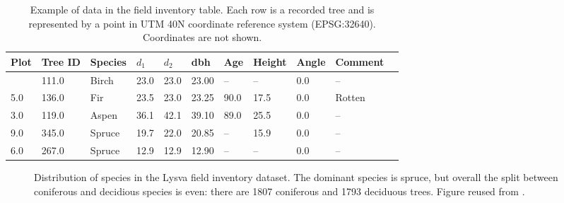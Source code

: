 \begin{longtable}[]{@{}lllllllllll@{}}

\caption[Example of data in the field inventory table.]{\label{tbl-inventory-example}Example of data in the field
inventory table. Each row is a recorded tree and is represented by a point in UTM 40N coordinate reference system (EPSG:32640). Coordinates are not shown.}

\tabularnewline

\toprule\noalign{}
Plot & Tree ID & Species & $d_1$ & $d_2$ & dbh & Age & Height & Angle &
Comment \\
\midrule\noalign{}
\endhead
\bottomrule\noalign{}
\endlastfoot
7.0 & 111.0 & Birch & 23.0 & 23.0 & 23.00 & – & – & 0.0 & – \\
5.0 & 136.0 & Fir & 23.5 & 23.0 & 23.25 & 90.0 & 17.5 & 0.0 & Rotten \\
3.0 & 119.0 & Aspen & 36.1 & 42.1 & 39.10 & 89.0 & 25.5 & 0.0 & – \\
9.0 & 345.0 & Spruce & 19.7 & 22.0 & 20.85 & – & 15.9 & 0.0 & – \\
6.0 & 267.0 & Spruce & 12.9 & 12.9 & 12.90 & – & – & 0.0 & – \\

\end{longtable}

\begin{figure}
\caption[Distribution of species in the Lysva field inventory dataset]{\label{fig-lysva-species-distribution}Distribution of species
in the Lysva field inventory dataset. The dominant species is spruce,
but overall the split between coniferous and decidious species is even:
there are 1807 coniferous and 1793 deciduous trees.
Figure reused from \citet{dubrovinOpenDatasetIndividual2024}.}
\end{figure}

